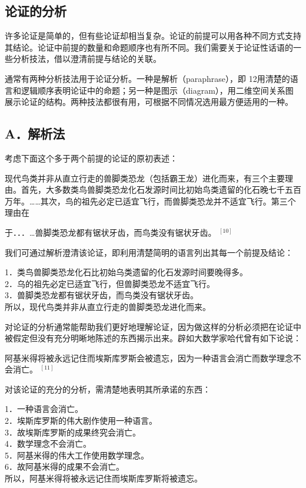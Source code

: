 \subsection{论证的分析}
许多论证是简单的，但有些论证却相当复杂。论证的前提可以用各种不同方式支持其结论。论证中前提的数量和命题顺序也有所不同。我们需要关于论证性话语的一些分析技法，借以澄清前提与结论的关联。

通常有两种分析技法用于论证分析。一种是解析（paraphrase），即 12用清楚的语言和逻辑顺序表明论证中的命题；另一种是图示（diagram），用二维空间关系图展示论证的结构。两种技法都很有用，可根据不同情况选用最方便适用的一种。

\subsection{A．解析法}
考虑下面这个多于两个前提的论证的原初表述：

现代鸟类并非从直立行走的兽脚类恐龙（包括霸王龙）进化而来，有三个主要理由。首先，大多数类鸟兽脚类恐龙化石发源时间比初始鸟类遗留的化石晚七千五百万年。……其次，鸟的祖先必定已适宜飞行，而兽脚类恐龙并不适宜飞行。第三个理由在

于．．．…兽脚类恐龙都有锯状牙齿，而鸟类没有锯状牙齿。 ${ }^{[10]}$

我们可通过解析澄清该论证，即利用清楚简明的语言列出其每一个前提及结论：

1．类鸟兽脚类恐龙化石比初始乌类遗留的化石发源时间要晚得多。\\
2．乌的祖先必定已适宜飞行，但兽脚类恐龙不适宜飞行。\\
3．兽脚类恐龙都有锯状牙齿，而鸟类没有锯状牙齿。\\
所以，现代鸟类并非从直立行走的兽脚类恐龙进化而来。

对论证的分析通常能帮助我们更好地理解论证，因为做这样的分析必须把在论证中被假定但没有充分明晰地陈述的东西揭示出来。辟如大数学家哈代曾有如下论说：

阿基米得将被永远记住而埃斯库罗斯会被遗忘，因为一种语言会消亡而数学理念不会消亡。 ${ }^{[11]}$

对该论证的充分的分析，需清楚地表明其所承诺的东西：

1．一种语言会消亡。\\
2．埃斯库罗斯的伟大剧作使用一种语言。\\
3．故埃斯库罗斯的成果终究会消亡。\\
4．数学理念不会消亡。\\
5．阿基米得的伟大工作使用数学理念。\\
6．故阿基米得的成果不会消亡。\\
所以，阿基米得将被永远记住而埃斯库罗斯将被遗忘。

